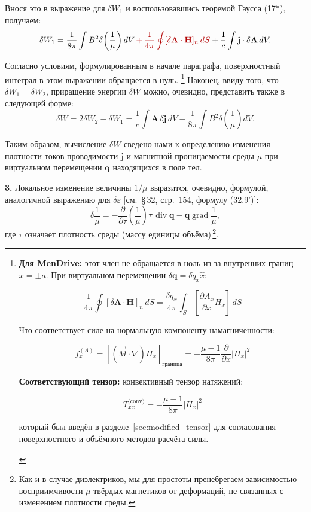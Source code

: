 \documentclass[a4paper,10pt]{article}
\newcommand{\redtext}[1]{\textcolor{redcolor}{#1}}
\newcommand{\redmath}[1]{\textcolor{redcolor}{#1}}
\newcommand{\modblock}[1]{\colorbox{modcolor!10}{\parbox{\dimexpr\linewidth-2\fboxsep}{#1}}}
\begin{document}
Внося это в выражение для $\delta W_1$ и воспользовавшись теоремой
Гаусса (17*), получаем:
$$
    \delta W_1 = \frac{1}{8\pi}\int B^2\delta\!\left(\frac{1}{\mu}\right)dV
               \redmath{\,+\,\frac{1}{4\pi}\oint[\delta\mathbf{A}\cdot\mathbf{H}]_n\,dS}
               + \frac{1}{c}\int\mathbf{j}\cdot\delta\mathbf{A}\,dV.
$$

\redtext{Согласно условиям, формулированным в начале параграфа, поверхностный
интеграл в этом выражении обращается в нуль}.
\footnote{
\modblock{
\textbf{Для MenDrive:} этот член не обращается в ноль из-за внутренних
границ $x = \pm a$. При виртуальном перемещении $\delta\mathbf{q} = \delta q_x\hat{x}$:

\begin{equation}
\frac{1}{4\pi}\oint[\delta\mathbf{A}\cdot\mathbf{H}]_n\,dS =
\frac{\delta q_x}{4\pi}\int_{S}\left[\frac{\partial A_x}{\partial x}H_x\right]\,dS
\label{eq:surface_A_H}
\end{equation}

Что соответствует силе на нормальную компоненту намагниченности:

\begin{equation}
f_x^{(A)} = \left[(\vec{M}\cdot\nabla)H_x\right]_{\text{граница}} =
-\frac{\mu-1}{8\pi}\frac{\partial}{\partial x}|H_x|^2
\label{eq:force_from_A}
\end{equation}

\textbf{Соответствующий тензор:} конвективный тензор натяжений:

\begin{equation}
T_{xx}^{\text{(conv)}} = -\frac{\mu-1}{8\pi}|H_x|^2
\label{eq:convective_tensor_from_A}
\end{equation}

который был введён в разделе~\ref{sec:modified_tensor} для согласования
поверхностного и объёмного методов расчёта силы.
}%
}%
Наконец, ввиду того, что
$\delta W_1 = \delta W_2$, приращение энергии $\delta W$ можно, очевидно,
представить также в следующей форме:
$$
    \delta W = 2\delta W_2 - \delta W_1
             = \frac{1}{c}\int\mathbf{A}\,\delta\mathbf{j}\,dV
             - \frac{1}{8\pi}\int B^2\delta\!\left(\frac{1}{\mu}\right)dV.
$$

Таким образом, вычисление $\delta W$ сведено нами к определению изменения
плотности токов проводимости $\mathbf{j}$ и магнитной проницаемости среды
$\mu$ при виртуальном перемещении $\mathbf{q}$ находящихся в поле тел.

\textbf{3.} Локальное изменение величины $1/\mu$ выразится, очевидно,
формулой, аналогичной выражению для $\delta\varepsilon$ [см.\ §\,32, стр.\ 154,
формулу (32.9')]:
$$
    \delta\frac{1}{\mu} = -\frac{\partial}{\partial\tau}\!\left(\frac{1}{\mu}\right)\tau\,
    \operatorname{div}\mathbf{q} - \mathbf{q}\operatorname{grad}\frac{1}{\mu},
$$
где $\tau$ означает плотность среды (массу единицы объёма)\,\footnote{Как
и в случае диэлектриков, мы для простоты пренебрегаем зависимостью
восприимчивости $\mu$ твёрдых магнетиков от деформаций, не связанных
с изменением плотности среды.}.
\end{document}
